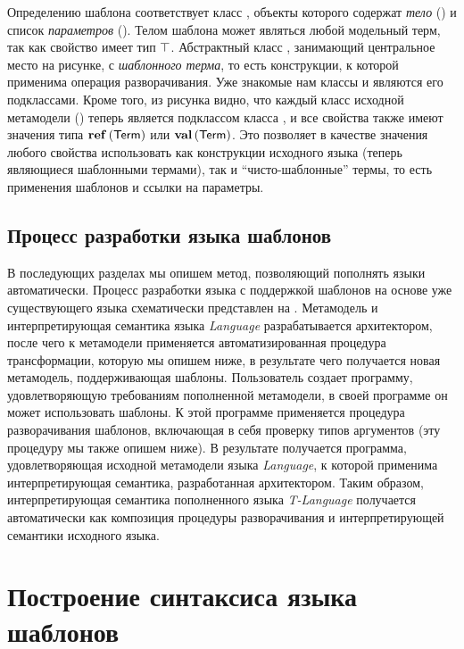 %
Определению шаблона соответствует класс , объекты которого содержат \emph{тело} () и список \emph{параметров} (). Телом шаблона может являться любой модельный терм, так как свойство  имеет тип $\top$. Абстрактный класс , занимающий центральное место на рисунке, с \emph{шаблонного терма}, то есть конструкции, к которой применима операция разворачивания. Уже знакомые нам классы  и  являются его подклассами.
Кроме того, из рисунка видно, что каждый класс исходной метамодели () теперь является подклассом класса , и все свойства также имеют значения типа $\mathbf{ref}\left(\mathsf{Term}\right)$ или $\mathbf{val}\left(\mathsf{Term}\right)$. Это позволяет в качестве значения любого свойства использовать как конструкции исходного языка (теперь являющиеся шаблонными термами), так и ``чисто-шаблонные'' термы, то есть применения шаблонов и ссылки на параметры.

\subsection{Процесс разработки языка шаблонов}

В последующих разделах мы опишем метод, позволяющий пополнять языки автоматически. Процесс разработки языка с поддержкой шаблонов на основе уже существующего языка схематически представлен на .
%
%
Метамодель и интерпретирующая семантика языка \emph{Language} разрабатывается архитектором, после чего к метамодели применяется автоматизированная процедура трансформации, которую мы опишем ниже, в результате чего получается новая метамодель, поддерживающая шаблоны. Пользователь создает программу, удовлетворяющую требованиям пополненной метамодели, в своей программе он может использовать шаблоны. К этой программе применяется процедура разворачивания шаблонов, включающая в себя проверку типов аргументов (эту процедуру мы также опишем ниже). В результате получается программа, удовлетворяющая исходной метамодели языка \emph{Language}, к которой применима интерпретирующая семантика, разработанная архитектором. Таким образом, интерпретирующая семантика пополненного языка \emph{T-Language} получается автоматически как композиция процедуры разворачивания и интерпретирующей семантики исходного языка.

\section{Построение синтаксиса языка шаблонов}

